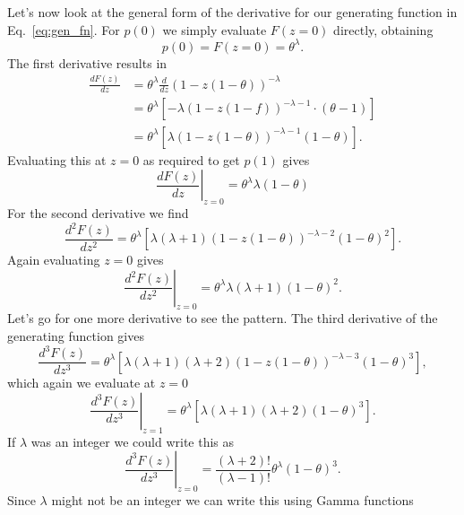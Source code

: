 Let's now look at the general form of the derivative for our generating function
in Eq.~\ref{eq:gen_fn}. For $p(0)$ we simply evaluate $F(z=0)$ directly, 
obtaining
\begin{equation}
p(0) = F(z=0) = \theta^{\lambda}.
\end{equation}
The first derivative results in
\begin{equation}
\begin{aligned}
\frac{d F(z)}{d z} &=\theta^{\lambda} \frac{d}{d z}(1-z(1-\theta))^{-\lambda} \\
&=\theta^{\lambda}\left[-\lambda(1-z(1-f))^{-\lambda-1} \cdot(\theta-1)\right]\\
&=\theta^{\lambda}\left[\lambda(1-z(1-\theta))^{-\lambda-1}(1-\theta)\right].
\end{aligned}
\end{equation}
Evaluating this at $z=0$ as required to get $p(1)$ gives
\begin{equation}
\left.\frac{d F(z)}{d z}\right|_{z=0}=\theta^{\lambda} \lambda(1-\theta)
\end{equation}
For the second derivative we find
\begin{equation}
\frac{d^{2} F(z)}{d z^{2}} = \theta^{\lambda}
\left[\lambda(\lambda+1)(1-z(1-\theta))^{-\lambda-2}(1-\theta)^{2}\right].
\end{equation}
Again evaluating $z = 0$ gives
\begin{equation}
\left.\frac{d^{2} F(z)}{d z^{2}}\right|_{z=0} = 
\theta^{\lambda} \lambda(\lambda+1)(1-\theta)^{2}.
\end{equation}
Let's go for one more derivative to see the pattern. The third derivative of the
generating function gives
\begin{equation}
\frac{d^{3} F(z)}{d z^{3}} = 
\theta^{\lambda} 
\left[\lambda(\lambda+1)
(\lambda+2)(1-z(1-\theta))^{-\lambda-3}(1-\theta)^{3}\right],
\end{equation}
which again we evaluate at $z=0$
\begin{equation}
\left.\frac{d^{3} F(z)}{d z^{3}}\right|_{z=1} =
\theta^{\lambda}\left[\lambda(\lambda+1)(\lambda+2)(1-\theta)^{3}\right].
\end{equation}
If $\lambda$ was an integer we could write this as
\begin{equation}
\left.\frac{d^{3} F(z)}{d z^{3}}\right|_{z=0} = 
\frac{(\lambda+2) !}{(\lambda-1) !} \theta^{\lambda}(1-\theta)^{3}.
\end{equation}
Since $\lambda$ might not be an integer we can write this using Gamma functions
